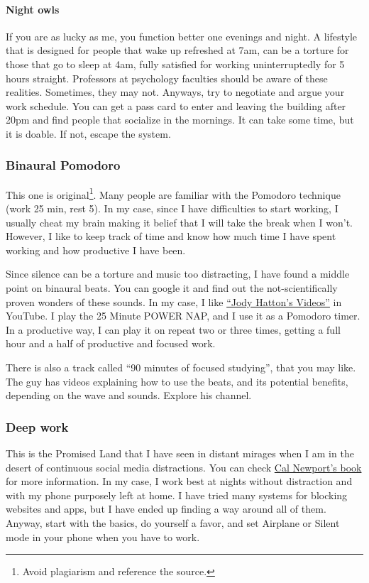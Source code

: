 \documentclass{article}
\begin{document}
\paragraph{Night owls}
\label{parag: Night}
If you are as lucky as me, you function better one evenings and night. A lifestyle that is designed for people that wake up refreshed at 7am, can be a torture for those that go to sleep at 4am, fully satisfied for working uninterruptedly for 5 hours straight. Professors at psychology faculties should be aware of these realities. Sometimes, they may not. Anyways, try to negotiate and argue your work schedule. You can get a pass card to enter and leaving the building after 20pm and find people that socialize in the mornings. It can take some time, but it is doable. If not, escape the system.
\subsubsection{Binaural Pomodoro}
\label{subsubsec: Pomodoro}
This one is original\footnote{Avoid plagiarism and reference the source.}. Many people are familiar with the Pomodoro technique (work 25 min, rest 5). In my case, since I have difficulties to start working, I usually cheat my brain making it belief that I will take the break when I won’t. However, I like to keep track of time and know how much time I have spent working and how productive I have been.

Since silence can be a torture and music too distracting, I have found a middle point on binaural beats. You can google it and find out the not-scientifically proven wonders of these sounds. In my case, I like \href{https://www.youtube.com/channel/UC6RzukLXWGBx6dOGqzaeK5w}{``Jody Hatton's Videos''} in YouTube. I play the 25 Minute POWER NAP, and I use it as a Pomodoro timer. In a productive way, I can play it on repeat two or three times, getting a full hour and a half of productive and focused work. 

There is also a track called “90 minutes of focused studying”, that you may like. The guy has videos explaining how to use the beats, and its potential benefits, depending on the wave and sounds. Explore his channel. 

\subsubsection{Deep work}
\label{subsubsec: Deep work}
This is the Promised Land that I have seen in distant mirages when I am in the desert of continuous social media distractions. You can check \href{https://www.calnewport.com/books/deep-work/}{Cal Newport’s book} for more information. In my case, I work best at nights without distraction and with my phone purposely left at home. I have tried many systems for blocking websites and apps, but I have ended up finding a way around all of them. Anyway, start with the basics, do yourself a favor, and set Airplane or Silent mode in your phone when you have to work. 
\end{document}
